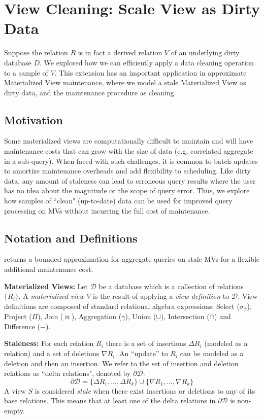 \section{View Cleaning: Scale View as Dirty Data \cite{krishnan2015svc}}
Suppose the relation $R$ is in fact a derived relation $V$ of an underlying dirty database $D$.
We explored how we can efficiently apply a data cleaning operation to a sample of $V$.
This extension has an important application in approximate Materialized View maintenance, where we model a stale Materialized View as dirty data, and the maintenance procedure as cleaning.  

\subsection{Motivation}
Some materialized views are computationally difficult to maintain and will have maintenance costs that can grow with the size of data (e.g, correlated aggregate in a sub-query).
When faced with such challenges, it is common to batch updates to amortize maintenance overheads and add flexibility to scheduling.
Like dirty data, any amount of staleness can lead to erroneous query results where the user has no idea about the magnitude or the scope of query error. 
Thus, we explore how samples of ``clean" (up-to-date) data can be used for improved query processing on MVs without incurring the full cost of maintenance.

\subsection{Notation and Definitions}\label{notation}
\svc returns a bounded approximation for aggregate queries on stale MVs for a flexible additional maintenance cost.

\noindent \textbf{Materialized Views:} Let $\mathcal{D}$ be a database which is a collection of relations $\{R_i\}$. 
A \emph{materialized view} $V$ is the result of applying a \emph{view definition} to $\mathcal{D}$. 
View definitions are composed of standard relational algebra expressions: Select ($\sigma_{\phi}$), Project ($\Pi$), Join ($\bowtie$), Aggregation ($\gamma$), Union ($\cup$), Intersection ($\cap$) and Difference ($-$). 

\vspace{0.5em}

\noindent \textbf{Staleness:} For each relation $R_i$ there is a set of insertions $\Delta R_i$ (modeled as a relation)
and a set of deletions $\nabla R_i$.
An ``update'' to $R_i$ can be modeled as a deletion and then an insertion.
We refer to the set of insertion and deletion relations as ``delta relations", denoted by $\partial \mathcal{D}$:
\[
	\partial \mathcal{D} = \{\Delta R_1,...,\Delta R_k\} \cup \{\nabla R_1,...,\nabla R_k\}
\]
A view $S$ is considered \emph{stale} when there exist insertions or deletions to any of its base relations.
This means that at least one of the delta relations in $\partial \mathcal{D}$ is non-empty.

